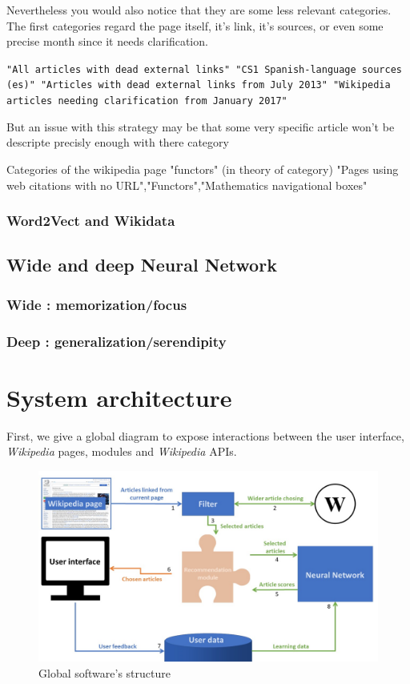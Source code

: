 \documentclass[11pt]{article}
\theoremstyle{plain}
\theoremstyle{definition}
\theoremstyle{remark}
\begin{document}
Nevertheless you would also notice that they are some less relevant categories. The first categories regard the page itself, it's link, it's sources, or even some precise month since it needs clarification.

 \begin{center}
	\texttt{"All articles with dead external links" "CS1 Spanish-language sources (es)" "Articles with dead external links from July 2013" "Wikipedia articles needing clarification from January 2017"}
 \end{center}
But an issue with this strategy may be that some very specific article won't be descripte precisly enough with there category 


Categories of the wikipedia page "functors" (in theory of category)
"Pages using web citations with no URL","Functors","Mathematics navigational boxes"

\subsubsection{Word2Vect and Wikidata}

\subsection{Wide and deep Neural Network}
\subsubsection{Wide : memorization/focus}
\subsubsection{Deep : generalization/serendipity}


\newpage

\section{System architecture}

First, we give a global diagram to expose interactions between the user interface, \textit{Wikipedia} pages, modules and \textit{Wikipedia} APIs. 

\begin{figure}[h!]
	\centering
    \includegraphics[width=400pt]{diagram.png}
    \caption{Global software's structure}
    \label{arch_glo}
\end{figure}
\end{document}
